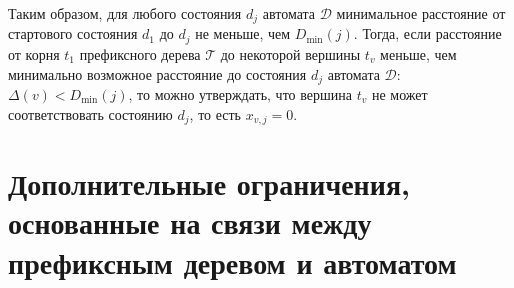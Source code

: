 Таким образом, для любого состояния $d_{j}$ автомата $\mathcal{D}$ минимальное расстояние от стартового состояния $d_{1}$ до $d_{j}$ не меньше, чем $D_{\min}\left(j\right)$. 
Тогда, если расстояние от корня $t_{1}$ префиксного дерева $\mathcal{T}$ до некоторой вершины $t_{v}$ меньше, чем минимально возможное расстояние до состояния $d_{j}$ автомата $\mathcal{D}$: $\Delta\left(v\right) < D_{\min}\left(j\right)$, то можно утверждать, что вершина $t_{v}$ не может соответствовать состоянию $d_{j}$, то есть $x_{v,j} = 0$.


\section{Дополнительные ограничения, основанные на связи между префиксным деревом и автоматом}
\label{sec:pruning:apta-exploiting}

